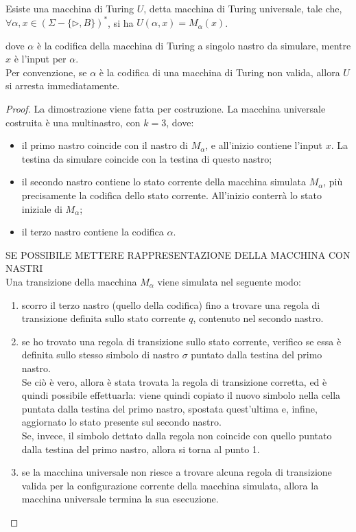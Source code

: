 \begin{thm}
    Esiste una macchina di Turing $U$, detta macchina di Turing universale, tale che, $\forall \alpha, x \in \left( \Sigma - \{ \triangleright , B \} \right)^*$, si ha $U(\alpha, x) = M_{\alpha} (x)$.
\end{thm}
dove $\alpha$ è la codifica della macchina di Turing a singolo nastro da simulare, mentre $x$ è l'input per $\alpha$.\\
Per convenzione, se $\alpha$ è la codifica di una macchina di Turing non valida, allora $U$ si arresta immediatamente.

\begin{proof}
    La dimostrazione viene fatta per costruzione.
    La macchina universale costruita è una multinastro, con $k = 3$, dove:
    \begin{itemize}
        \item il primo nastro coincide con il nastro di $M_{\alpha}$, e all'inizio contiene l'input $x$. La testina da simulare coincide con la testina di questo nastro;
        \item il secondo nastro contiene lo stato corrente della macchina simulata $M_{\alpha}$, più precisamente la codifica dello stato corrente. All'inizio conterrà lo stato iniziale di $M_{\alpha}$;
        \item il terzo nastro contiene la codifica $\alpha$.
    \end{itemize}
    SE POSSIBILE METTERE RAPPRESENTAZIONE DELLA MACCHINA CON NASTRI\\
    Una transizione della macchina $M_{\alpha}$ viene simulata nel seguente modo:
    \begin{enumerate}
        \item scorro il terzo nastro (quello della codifica) fino a trovare una regola di transizione definita sullo stato corrente $q$, contenuto nel secondo nastro.
        \item se ho trovato una regola di transizione sullo stato corrente, verifico se essa è definita sullo stesso simbolo di nastro $\sigma$ puntato dalla testina del primo nastro.\\
        Se ciò è vero, allora è stata trovata la regola di transizione corretta, ed è quindi possibile effettuarla: viene quindi copiato il nuovo simbolo nella cella puntata dalla testina del primo nastro, spostata quest'ultima e, infine, aggiornato lo stato presente sul secondo nastro.\\
        Se, invece, il simbolo dettato dalla regola non coincide con quello puntato dalla testina del primo nastro, allora si torna al punto 1.
        \item se la macchina universale non riesce a trovare alcuna regola di transizione valida per la configurazione corrente della macchina simulata, allora la macchina universale termina la sua esecuzione.
    \end{enumerate}
\end{proof}

